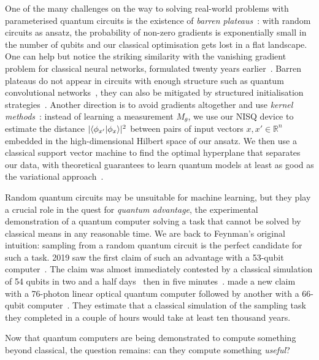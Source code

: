 One of the many challenges on the way to solving real-world problems with parameterised quantum circuits is the existence of \emph{barren plateaus}~\cite{McCleanEtAl18}:
with random circuits as ansatz, the probability of non-zero gradients is exponentially small in the number of qubits and our classical optimisation gets lost in a flat landscape.
One can help but notice the striking similarity with the vanishing gradient
problem for classical neural networks, formulated twenty years earlier~\cite{Hochreiter98}.
Barren plateaus do not appear in circuits with enough structure such as quantum convolutional networks~\cite{PesahEtAl21}, they can also be mitigated by structured initialisation strategies~\cite{GrantEtAl19}.
Another direction is to avoid gradients altogether and use \emph{kernel methods}~\cite{SchuldKilloran19}:
instead of learning a measurement $M_\theta$, we use our NISQ device to estimate the distance $|\langle\phi_{x'}|\phi_x\rangle|^2$ between pairs of input vectors $x, x' \in \mathbb{R}^n$ embedded in the high-dimensional Hilbert space of our ansatz.
We then use a classical support vector machine to find the optimal hyperplane that separates our data, with theoretical guarantees to learn quantum models at least as good as the variational approach~\cite{Schuld21}.

Random quantum circuits may be unsuitable for machine learning, but they play a crucial role in the quest for \emph{quantum advantage}, the experimental demonstration of a quantum computer solving a task that cannot be solved by classical means in any reasonable time.
We are back to Feynman's original intuition: sampling from a random quantum circuit is the perfect candidate for such a task.
2019 saw the first claim of such an advantage with a 53-qubit computer~\cite{AruteEtAl19}.
The claim was almost immediately contested by a classical simulation of 54 qubits in two and a half days~\cite{PednaultEtAl19} then in five minutes~\cite{YongEtAl21}.
\cite{ZhongEtAl20a} made a new claim with a 76-photon linear optical quantum computer followed by another with a 66-qubit computer~\cite{WuEtAl21,ZhuEtAl21}.
They estimate that a classical simulation of the sampling task they completed in a couple of hours would take at least ten thousand years.

Now that quantum computers are being demonstrated to compute something beyond classical, the question remains: can they compute something \emph{useful}?
